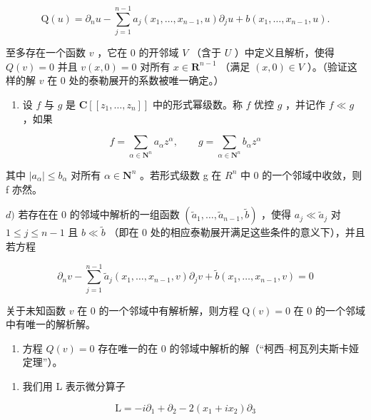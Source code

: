\[
\mathrm{Q} (u) = \partial_ {n} u - \sum_ {j = 1} ^ {n - 1} a _ {j} (x _ {1}, \dots , x _ {n - 1}, u) \partial_ {j} u + b (x _ {1}, \dots , x _ {n - 1}, u).
\]

至多存在一个函数 \(v\) ，它在 0 的开邻域 \(V\) （含于 \(U\) ）中定义且解析，使得 \(Q(v) = 0\) 并且 \(v(x,0) = 0\) 对所有 \(x \in \mathbf{R}^{n-1}\) （满足 \((x,0) \in V\) ）。（验证这样的解 \(v\) 在 0 处的泰勒展开的系数被唯一确定。）

\begin{enumerate}
\def\labelenumi{\alph{enumi})}
\setcounter{enumi}{2}
\tightlist
\item
  设 \(f\) 与 \(g\) 是 \(\mathbf{C}[[z_1, \ldots, z_n]]\) 中的形式幂级数。称 \(f\) 优控 \(g\) ，并记作 \(f \ll g\) ，如果
\end{enumerate}

\[
f = \sum_ {\alpha \in \mathbf {N} ^ {n}} a _ {\alpha} z ^ {\alpha}, \qquad g = \sum_ {\alpha \in \mathbf {N} ^ {n}} b _ {\alpha} z ^ {\alpha}
\]

其中 \(|a_{\alpha}| \leqslant b_{\alpha}\) 对所有 \(\alpha \in \mathbf{N}^{n}\) 。若形式级数 g 在 \(R^{n}\) 中 0 的一个邻域中收敛，则 f 亦然。

\(d)\) 若存在在 0 的邻域中解析的一组函数 \((\widetilde{a}_1, \ldots, \widetilde{a}_{n-1}, \widetilde{b})\) ，使得 \(a_j \ll \widetilde{a}_j\) 对 \(1 \leqslant j \leqslant n-1\) 且 \(b \ll \widetilde{b}\) （即在 0 处的相应泰勒展开满足这些条件的意义下），并且若方程

\[
\partial_ {n} v - \sum_ {j = 1} ^ {n - 1} \widetilde {a} _ {j} (x _ {1}, \dots , x _ {n - 1}, v) \partial_ {j} v + \widetilde {b} (x _ {1}, \dots , x _ {n - 1}, v) = 0
\]

关于未知函数 \(v\) 在 0 的一个邻域中有解析解，则方程 \(\mathrm{Q}(v) = 0\) 在 0 的一个邻域中有唯一的解析解。

\begin{enumerate}
\def\labelenumi{\alph{enumi})}
\setcounter{enumi}{4}
\tightlist
\item
  方程 \(Q(v) = 0\) 存在唯一的在 0 的邻域中解析的解（“柯西–柯瓦列夫斯卡娅定理”）。
\end{enumerate}

\begin{enumerate}
\def\labelenumi{\arabic{enumi})}
\setcounter{enumi}{30}
\tightlist
\item
  我们用 L 表示微分算子
\end{enumerate}

\[
\mathrm{L} = - i \partial_ {1} + \partial_ {2} - 2 (x _ {1} + i x _ {2}) \partial_ {3}
\]

